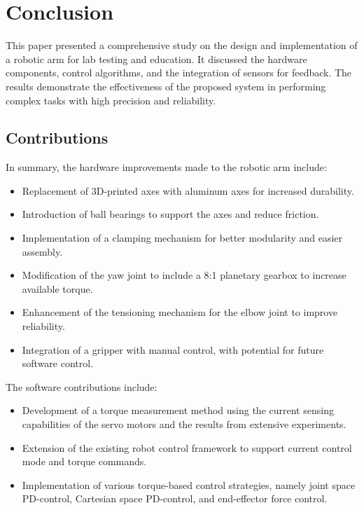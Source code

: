 \section{Conclusion}
This paper presented a comprehensive study on the design and implementation of a robotic arm for lab testing and education. It discussed the hardware components,
control algorithms, and the integration of sensors for feedback. The results demonstrate the effectiveness of the proposed system in performing complex tasks with high precision
and reliability.

\subsection{Contributions}
In summary, the hardware improvements made to the robotic arm include:

\begin{itemize}
    \item Replacement of 3D-printed axes with aluminum axes for increased durability.
    \item Introduction of ball bearings to support the axes and reduce friction.
    \item Implementation of a clamping mechanism for better modularity and easier assembly.
    \item Modification of the yaw joint to include a 8:1 planetary gearbox to increase available torque.
    \item Enhancement of the tensioning mechanism for the elbow joint to improve reliability.
    \item Integration of a gripper with manual control, with potential for future software control.
\end{itemize}

The software contributions include:

\begin{itemize}
    \item Development of a torque measurement method using the current sensing capabilities of the servo motors and the results from extensive experiments.
    \item Extension of the existing robot control framework to support current control mode and torque commands.
    \item Implementation of various torque-based control strategies, namely joint space PD-control, Cartesian space PD-control, and end-effector force control.
\end{itemize}

